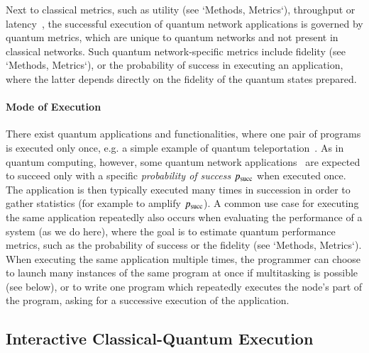 Next to classical metrics, such as utility (see `Methods, Metrics`), throughput or latency~\cite{stankiewicz_commag}, the successful execution of quantum network applications is governed by quantum metrics, which are unique to quantum networks and not present in classical networks. Such quantum network-specific metrics include fidelity (see `Methods, Metrics`), or the probability of success in executing an application, where the latter depends directly on the fidelity of the quantum states prepared.

\paragraph{Mode of Execution}

There exist quantum applications and functionalities, where one pair of programs is executed only once, e.g. a simple example of quantum teleportation~\cite{bennett_1993_teleportation}. As in quantum computing, however, some quantum network applications~\cite{wehner_2018_stages} are expected to succeed only with a specific \emph{probability of success} $p_{\rm succ}$ when executed once. The application is then typically executed many times in succession in order to gather statistics (for example to amplify $p_{\rm succ}$). A common use case for executing the same application repeatedly also occurs when evaluating the performance of a system (as we do here), where the goal is to estimate quantum performance metrics, such as the probability of success or the fidelity (see `Methods, Metrics`).
When executing the same application multiple times, the programmer can choose to launch many instances of the same program at once if multitasking is possible (see below), or to write one program which repeatedly executes the node's part of the program, asking for a successive execution of the application.

\subsection{Interactive Classical-Quantum Execution}

